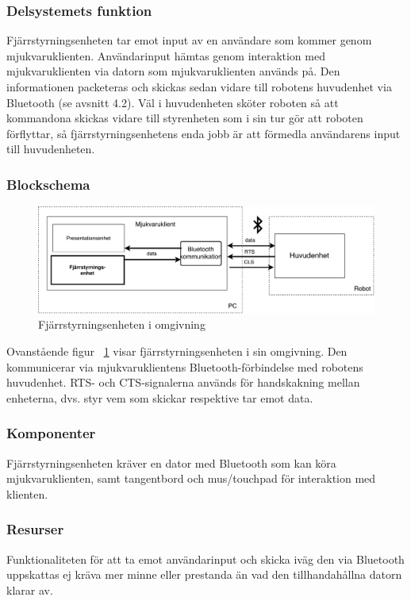 \documentclass{article}
\begin{document}
\subsubsection{Delsystemets funktion}
Fjärrstyrningsenheten tar emot input av en användare som kommer genom mjukvaruklienten. Användarinput hämtas genom interaktion med mjukvaruklienten via datorn som mjukvaruklienten används på. Den informationen packeteras och skickas sedan vidare till robotens huvudenhet via Bluetooth (se avsnitt 4.2). Väl i huvudenheten sköter roboten så att kommandona skickas vidare till styrenheten som i sin tur gör att roboten förflyttar, så fjärrstyrningsenhetens enda jobb är att förmedla användarens input till huvudenheten.


\subsubsection{Blockschema}
\begin{figure}[H]
\centering 
\includegraphics[scale=0.5]{Oversikt_fjarrstyrenhet}
\caption{Fjärrstyrningsenheten i omgivning}
\label{fig:Oversikt_fjarrstyrenhet}
\end{figure}
Ovanstående figur ~\ref{fig:Oversikt_fjarrstyrenhet} visar fjärrstyrningsenheten i sin omgivning. Den kommunicerar via mjukvaruklientens Bluetooth-förbindelse med robotens huvudenhet. RTS- och CTS-signalerna används för handskakning mellan enheterna, dvs. styr vem som skickar respektive tar emot data.  

\subsubsection{Komponenter}
Fjärrstyrningsenheten kräver en dator med Bluetooth som kan köra mjukvaruklienten, samt tangentbord och mus/touchpad för interaktion med klienten. 

\subsubsection{Resurser}
Funktionaliteten för att ta emot användarinput och skicka iväg den via Bluetooth uppskattas ej kräva mer minne eller prestanda än vad den tillhandahållna datorn klarar av.
\end{document}
